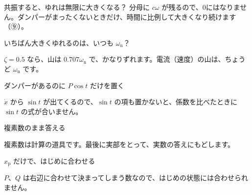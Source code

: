 
\begin{tsumazuki}{共振すると、ゆれは無限に大きくなる？}
分母に $c\omega$ が残るので、0にはなりません。ダンパーがまったくないときだけ、時間に比例して大きくなり続けます（⑨）。
\end{tsumazuki}

\noindent\begin{minipage}[t]{0.485\linewidth}\vspace{0pt}
\begin{tsumazuki}{いちばん大きくゆれるのは、いつも $\omega_{\mathrm n}$？}\raggedright
{}
$\zeta=0.5$ なら、山は $0.707\omega_{\mathrm n}$ で、かなりずれます。電流（速度）の山は、ちょうど $\omega_{\mathrm n}$ です。
\end{tsumazuki}
\end{minipage}\hfill
\begin{minipage}[t]{0.485\linewidth}\vspace{0pt}
\begin{tsumazuki}{ダンパーがあるのに $P\cos t$ だけを置く}\raggedright
{}
$\dot x$ から $\sin t$ が出てくるので、$\sin t$ の項も置かないと、係数を比べたときに $\sin t$ の式が合いません。
\end{tsumazuki}
\end{minipage}


\noindent\begin{minipage}[t]{0.485\linewidth}\vspace{0pt}
\begin{tsumazuki}{複素数のまま答える}\raggedright
{}
複素数は計算の道具です。最後に実部をとって、実数の答えにもどします。
\end{tsumazuki}
\end{minipage}\hfill
\begin{minipage}[t]{0.485\linewidth}\vspace{0pt}
\begin{tsumazuki}{$x_{\mathrm p}$ だけで、はじめに合わせる}\raggedright
{}
$P$、$Q$ は右辺に合わせて決まってしまう数なので、はじめの状態には合わせられません。
\end{tsumazuki}
\end{minipage}


